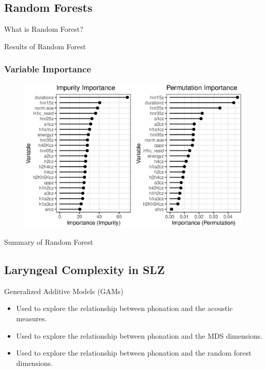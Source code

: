 \documentclass{beamer}
\begin{document}
\subsection{Random Forests}

\begin{frame}{What is Random Forest?}
  
\end{frame}

\begin{frame}{Results of Random Forest}
  
\end{frame}

\begin{frame}
  \frametitle{Variable Importance}
  \begin{figure}[h!]
    \centering
    \includegraphics[width = 0.8\linewidth]{images/RandomForest/rf_dur_plots.eps}
  \end{figure}
\end{frame}

\begin{frame}{Summary of Random Forest}
  
\end{frame}

\subsection{Laryngeal Complexity in SLZ}

\begin{frame}{Generalized Additive Models (GAMs)}
  \begin{itemize}
    \item Used to explore the relationship between phonation and the acoustic measures.
    \item Used to explore the relationship between phonation and the MDS dimensions.
    \item Used to explore the relationship between phonation and the random forest dimensions.
  \end{itemize}
\end{frame}
\end{document}

